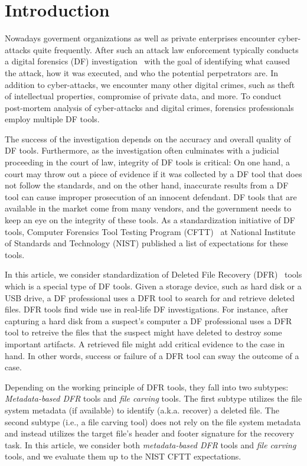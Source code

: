 \section{Introduction}\label{intro}

Nowadays goverment organizations as well as private enterprises encounter cyber-attacks quite frequently.
After such an attack law enforcement typically conducts a digital forensics (DF) investigation~\cite{df:news} \morecite 
with the goal of identifying what caused the attack, how it was executed, and who the potential perpetrators are. 
In addition to cyber-attacks, we encounter many other digital crimes, such as theft of intellectual properties, 
compromise of private data, and more. To conduct post-mortem analysis of cyber-attacks and digital crimes, forensics professionals
employ multiple DF tools. 

The success of the investigation depends on the accuracy and overall quality of DF tools.
Furthermore, as the investigation often culminates with a judicial proceeding in the court of law, integrity of DF tools 
is critical: On one hand, a court may throw out a piece of evidence if it was collected by a DF tool that does not follow the standards, 
and on the other hand, inaccurate results from a DF tool can cause improper prosecution of an innocent defendant. 
DF tools that are available in the market come from many vendors, and the government needs to keep an eye on the integrity of these tools. 
As a standardization initiative of DF tools,  Computer Forensics Tool Testing Program (CFTT)~\cite{cftt:nist} 
at National Institute of Standards and Technology (NIST) published a list of expectations for these tools. 

In this article, we consider standardization of Deleted File Recovery (DFR)~\cite{meta:dfr:standards} \morecite tools which is a special type of DF tools. 
Given a storage device, such as hard disk or a USB drive, a DF professional uses a DFR tool to search for and retrieve deleted files.
DFR tools find wide use in real-life DF investigations. For instance, after capturing a hard disk from a suspect's computer a
DF professional uses a DFR tool to retreive the files that the suspect might have deleted to destroy some important artifacts.
A retrieved file might add critical evidence to the case in hand. In other words, success or failure of a DFR tool can sway the outcome of a case.

Depending on the working principle of DFR tools, they fall into two subtypes: \emph{Metadata-based DFR} tools and \emph{file carving} tools.
The first subtype utilizes the file system metadata (if available) to identify (a.k.a. recover) a deleted file. 
The second subtype (i.e., a file carving tool) does not rely on the file system metadata and instead utilizes the target file's 
header and footer signature for the recovery task. 
In this article, we consider both \emph{metadata-based DFR} tools and \emph{file carving} tools, and we evaluate them up to the NIST CFTT expectations.       

